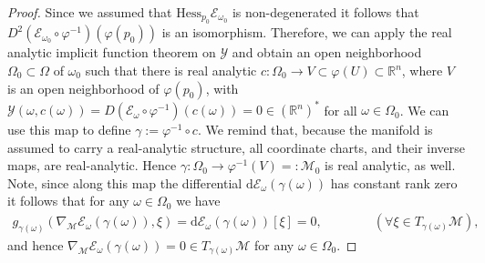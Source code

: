 \documentclass[reqno]{amsart}
\begin{document}
\begin{proof}
    Since we assumed that $\text{Hess}_{p_0}\mathcal{E}_{\omega_0}$ is non-degenerated it follows that $D^2(\mathcal{E}_{\omega_0}\circ \varphi^{-1})(\varphi(p_0))$ is an isomorphism. Therefore, we can apply the real analytic implicit function theorem on $\mathcal{Y}$ and obtain an open neighborhood $\Omega_0 \subset \Omega$ of $\omega_0$ such that there is real analytic $c:\Omega_0\longrightarrow V\subset \varphi(U)\subset \mathbb{R}^n$, where $V$ is an open neighborhood of $\varphi(p_0)$, with $\mathcal{Y}(\omega,c(\omega))=D(\mathcal{E}_{\omega}\circ \varphi^{-1})(c(\omega))=0 \in (\mathbb{R}^n)^*$ for all $\omega\in \Omega_0$. We can use this map to define $\gamma:=\varphi^{-1}\circ c$. We remind that, because the manifold is assumed to carry a real-analytic structure, all coordinate charts, and their inverse maps, are real-analytic. Hence $\gamma: \Omega_0 \longrightarrow \varphi^{-1}(V)=:\mathcal{M}_0$ is real analytic, as well. Note, since along this map the differential $\mathrm{d}\mathcal{E}_{\omega}(\gamma(\omega))$ has constant rank zero it follows that for any $\omega\in \Omega_0$ we have
    \begin{align}
        g_{\gamma(\omega)}(\nabla_\mathcal{M}  \mathcal{E}_\omega(\gamma(\omega)),\xi)=\mathrm{d}\mathcal{E}_{\omega}(\gamma(\omega))[\xi]=0,\qquad\qquad(\forall \xi \in T_{\gamma(\omega)}\mathcal{M}),
    \end{align}
    and hence $\nabla_\mathcal{M}  \mathcal{E}_\omega(\gamma(\omega))=0\in T_{\gamma(\omega)}\mathcal{M}$ for any $\omega\in \Omega_0$. 
\end{proof}
\end{document}

